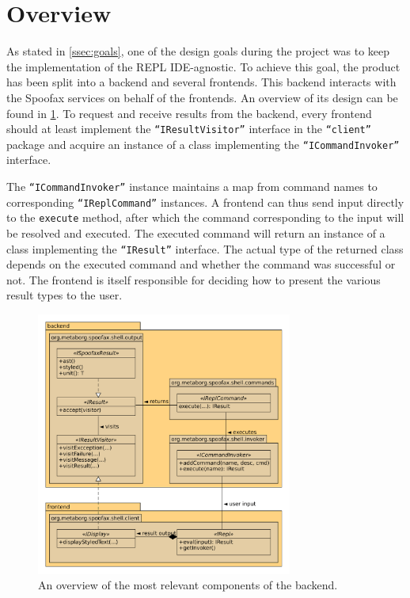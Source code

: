 \section{Overview}
\label{sec:overview}

As stated in \cref{ssec:goals}, one of the design goals during the project was
to keep the implementation of the REPL IDE-agnostic. To achieve this goal, the
product has been split into a backend and several frontends. This backend
interacts with the Spoofax services on behalf of the frontends. An overview of
its design can be found in \cref{fig:uml-overview}. To request and receive
results from the backend, every frontend should at least implement the
\texttt{``IResultVisitor''} interface in the \texttt{``client''} package and
acquire an instance of a class implementing the \texttt{``ICommandInvoker''}
interface.

The \texttt{``ICommandInvoker''} instance maintains a map from command names to
corresponding \texttt{``IReplCommand''} instances. A frontend can thus send
input directly to the \texttt{execute} method, after which the command
corresponding to the input will be resolved and executed. The executed command
will return an instance of a class implementing the \texttt{``IResult''}
interface. The actual type of the returned class depends on the executed command
and whether the command was successful or not. The frontend is itself
responsible for deciding how to present the various result types to the user.

\begin{figure}[h!]
  \centering
  \includegraphics[width=0.75\textwidth]{uml-overview}
  \caption{An overview of the most relevant components of the backend.}
  \label{fig:uml-overview}
\end{figure}
